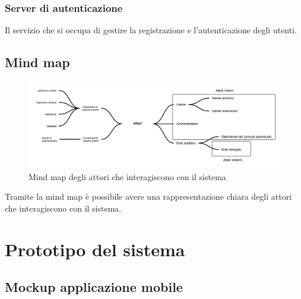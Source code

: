 \documentclass{article}
\begin{document}
\subsubsection{Server di autenticazione}
\label{3.4.1}
Il servizio che si occupa di gestire la registrazione e l'autenticazione degli utenti.

\vspace{20pt}

\subsection{Mind map}

\begin{figure}[htbp]
    \label{fig:Mind_map}
    \centering
    \includegraphics[width=1\textwidth]{Images/MindMap.png}
    \caption{Mind map degli attori che interagiscono con il sistema}
\end{figure}

Tramite la mind map è possibile avere una rappresentazione chiara degli attori che interagiscono con il sistema.\\
\clearpage

\section{Prototipo del sistema}

\subsection{Mockup applicazione mobile}
\end{document}
